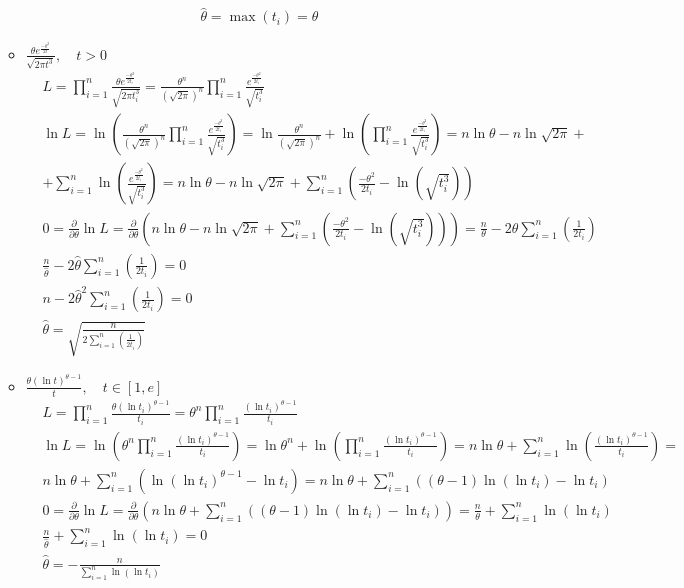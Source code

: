 \documentclass{assignment}
\begin{document}
\begin{enumerate}
\begin{itemize}
\begin{align*}
            &\hat{\theta} = \max (t_i) = \theta
        \end{align*}
        \finish
        \item $\displaystyle \frac{\theta e^{\frac{-\theta^2}{2t}}}{\sqrt{2 \pi t^3}}, \quad t > 0$
        \start
        \begin{align*}
            &L = \prod_{i=1}^{n} \frac{\theta e^{\frac{-\theta^2}{2t_i}}}{\sqrt{2 \pi t_i^3}} = \frac{\theta^n}{(\sqrt{2\pi})^n} \prod_{i=1}^{n} \frac{e^{\frac{-\theta^2}{2t_i}}}{\sqrt{t_i^3}} \\
            &\ln L = \ln (\frac{\theta^n}{(\sqrt{2\pi})^n} \prod_{i=1}^{n} \frac{e^{\frac{-\theta^2}{2t_i}}}{\sqrt{t_i^3}}) = \ln \frac{\theta^n}{(\sqrt{2\pi})^n} + \ln (\prod_{i=1}^{n} \frac{e^{\frac{-\theta^2}{2t_i}}}{\sqrt{t_i^3}}) = n\ln\theta - n\ln\sqrt{2\pi} + \\
            &+\sum_{i=1}^{n} \ln(\frac{e^{\frac{-\theta^2}{2t_i}}}{\sqrt{t_i^3}}) = n\ln\theta - n\ln\sqrt{2\pi} + \sum_{i=1}^{n} (\frac{-\theta^2}{2t_i} - \ln (\sqrt{t_i^3})) \\
            &0 = \frac{\partial}{\partial \theta}\ln L = \frac{\partial}{\partial \theta}(n\ln\theta - n\ln\sqrt{2\pi} + \sum_{i=1}^{n} (\frac{-\theta^2}{2t_i} - \ln (\sqrt{t_i^3}))) = \frac{n}{\theta} -2\theta \sum_{i=1}^{n} (\frac{1}{2t_i}) \\
            &\frac{n}{\hat{\theta}} -2\hat{\theta} \sum_{i=1}^{n} (\frac{1}{2t_i}) = 0 \\
            &n -2\hat{\theta}^2 \sum_{i=1}^{n} (\frac{1}{2t_i}) = 0 \\
            &\hat{\theta} = \sqrt{\frac{n}{2\sum_{i=1}^{n} (\frac{1}{2t_i})}}
        \end{align*}
        \finish
        \item $\displaystyle \frac{\theta (\ln{t})^{\theta - 1}}{t}, \quad t \in [1, e]$
        \start
        \begin{align*}
            &L = \prod_{i=1}^{n} \frac{\theta (\ln{t_i})^{\theta - 1}}{t_i} = \theta^n \prod_{i=1}^{n} \frac{(\ln{t_i})^{\theta - 1}}{t_i} \\
            &\ln L = \ln (\theta^n \prod_{i=1}^{n} \frac{(\ln{t_i})^{\theta - 1}}{t_i}) = \ln \theta^n + \ln (\prod_{i=1}^{n} \frac{(\ln{t_i})^{\theta - 1}}{t_i}) = n\ln\theta + \sum_{i=1}^{n} \ln(\frac{(\ln{t_i})^{\theta - 1}}{t_i}) = \\
            &n\ln\theta + \sum_{i=1}^{n} (\ln(\ln{t_i})^{\theta - 1} - \ln t_i) = n\ln\theta + \sum_{i=1}^{n} ((\theta - 1)\ln(\ln{t_i}) - \ln t_i) \\
            &0 = \frac{\partial}{\partial \theta}\ln L = \frac{\partial}{\partial \theta}(n\ln\theta + \sum_{i=1}^{n} ((\theta - 1)\ln(\ln{t_i}) - \ln t_i)) = \frac{n}{\theta} + \sum_{i=1}^{n} \ln(\ln{t_i}) \\
            &\frac{n}{\hat{\theta}} + \sum_{i=1}^{n} \ln(\ln{t_i}) = 0 \\
            &\hat{\theta} = -\frac{n}{\sum_{i=1}^{n} \ln(\ln{t_i})}
        \end{align*}
        \finish
    \end{itemize}


\end{enumerate}
\end{document}
